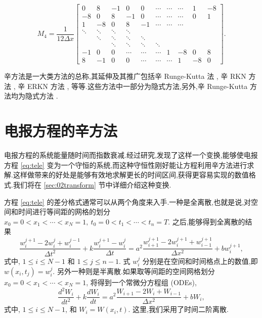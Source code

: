 \begin{equation*}
	M_4=\frac{1}{12\Delta x}\begin{bmatrix}
0 & 8 & -1 & 0 & 0 & \cdots & \cdots & \cdots & 1 & -8\\
-8 & 0 & 8 & -1 & 0 & \cdots & \cdots & \cdots & 0 & 1\\
1 & -8 & 0 & 8 & -1 & \cdots & \cdots & \cdots && \\
\ddots & \ddots & \ddots & \ddots &   &   &   &   && \\
&\ddots & \ddots & \ddots & \ddots &   &   &   &&\\
&&\ddots & \ddots & \ddots & \ddots &   &   && \\
-1 & 0 & 0 & \cdots & \cdots & \cdots & 1 & -8 & 0&8 \\
8&-1 & 0 & 0 & \cdots  & \cdots & \cdots & 1 & -8 & 0
\end{bmatrix}.
\end{equation*}

辛方法是一大类方法的总称,其延伸及其推广包括辛 Runge-Kutta 法 \cite{feng2010symplectic,burrage2014structure}, 辛 RKN 方法 \cite{monovasilis2013exponentially}, 辛 ERKN 方法 \cite{yang2009extended}, 等等.这些方法中一部分为隐式方法,另外,辛 Runge-Kutta 方法均为隐式方法 \cite{sanz1988runge}.

\section{电报方程的辛方法}\label{sec:02telegraph}

电报方程的系统能量随时间而指数衰减.经过研究,发现了这样一个变换,能够使电报方程 \eqref{eq:tele} 变为一个守恒的系统,而这种守恒性刚好能让方程利用辛方法进行求解.这样做带来的好处是能够有效地求解更长的时间区间,获得更容易实现的数值格式.我们将在 \ref{sec:02transform} 节中详细介绍这种变换.

方程 \eqref{eq:tele} 的差分格式通常可以从两个角度来入手.一种是全离散,也就是说,对空间和时间进行等间距的网格的划分 $x_0=0<x_1<\cdots<x_N=1,~t_0=0<t_1<\cdots<t_n=T$. 之后,能够得到全离散的结果
\begin{equation}\label{eq:fulld}
\frac{w_{i}^{j+1}-2w_{i}^{j}+w_{i}^{j-1}}{\Delta t^2}+k\frac{w_{i}^{j+1}-w_{i}^{j}}{\Delta t}=a^2
\frac{w_{i+1}^{j+1}-2w_{i}^{j+1}+w_{i-1}^{j+1}}{\Delta x^2} + b w_{i}^{j+1},
\end{equation}
式中, $1 \le i \le N-1$ 和 $1 \le j \le n-1$. 式 $w_{i}^{j}$ 分别是在空间和时间格点上的数值,即$w(x_i,t_j)=w_{i}^{j}$.
另外一种则是半离散.如果取等间距的空间网格划分 $x_0=0<x_1<\cdots<x_N=1$, 将得到一个常微分方程组 (ODEs),
\begin{equation*}
\frac{d^2 W_i}{d t^2}+k\frac{d W_i}{d t}=a^2 \frac{W_{i+1}-2W_{i}+W_{i-1}}{\Delta x^2} + b W_i,
\end{equation*}
式中, $1 \le i \le N-1$, 和 $W_i = W(x_i,t)$. 这里,我们采用了时间二阶离散.

